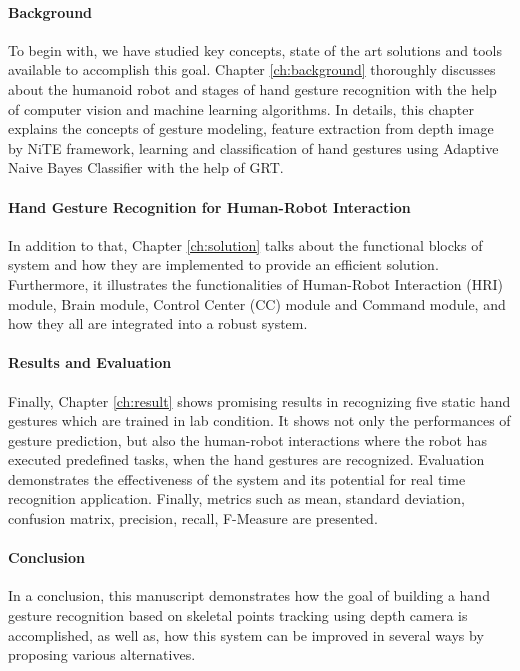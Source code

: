 \paragraph*{Background} To begin with, we have studied key concepts, state of the art solutions and tools available to accomplish this goal. Chapter \ref{ch:background} thoroughly discusses about the humanoid robot and stages of hand gesture recognition with the help of computer vision and machine learning algorithms. In details, this chapter explains the concepts of gesture modeling, feature extraction from depth image by NiTE framework, learning and classification of hand gestures using Adaptive Naive Bayes Classifier with the help of GRT.

\paragraph*{Hand Gesture Recognition for Human-Robot Interaction} In addition to that, Chapter \ref{ch:solution} talks about the functional blocks of system and how they are implemented to provide an efficient solution. Furthermore, it illustrates the functionalities of Human-Robot Interaction (HRI) module, Brain module, Control Center (CC) module and Command module, and how they all are integrated into a robust system.

\paragraph*{Results and Evaluation} Finally, Chapter \ref{ch:result} shows promising results in recognizing five static hand gestures which are trained in lab condition. It shows not only the performances of gesture prediction, but also the human-robot interactions where the robot has executed predefined tasks, when the hand gestures are recognized. Evaluation demonstrates the effectiveness of the system and its potential for real time recognition application. Finally, metrics such as mean, standard deviation, confusion matrix, precision, recall, F-Measure are presented.

\paragraph*{Conclusion} In a conclusion, this manuscript demonstrates how the goal of building a hand gesture recognition based on skeletal points tracking using depth camera is accomplished, as well as, how this system can be improved in several ways by proposing various alternatives.
